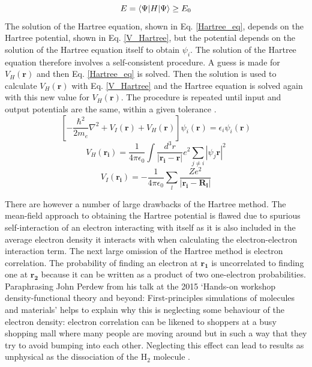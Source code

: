 \documentclass[11pt, twoside]{report}
\begin{document}
\begin{equation}\label{var_princip}
E = \braket{\Psi | H | \Psi } \geq E_0
\end{equation}
The solution of the Hartree equation, shown in Eq. \ref{Hartree_eq}, depends on the Hartree potential, shown in Eq. \ref{V_Hartree}, but the potential depends on the solution of the Hartree equation itself to obtain $\psi_i$. The solution of the Hartree equation therefore involves a self-consistent procedure. A guess is made for $V_H(\mathbf{r})$ and then Eq. \ref{Hartree_eq} is solved. Then the solution is used to calculate $V_H(\mathbf{r})$ with Eq. \ref{V_Hartree} and the Hartree equation is solved again with this new value for $V_H(\mathbf{r})$. The procedure is repeated until input and output potentials are the same, within a given tolerance \cite{Prasad_ch2}.
\begin{equation}\label{Hartree_eq}
\left[ -\frac{\hbar^2}{2m_e}\nabla^2 + V_I(\mathbf{r}) + V_H(\mathbf{r}) \right] \psi_i(\mathbf{r}) = \epsilon_i \psi_i(\mathbf{r})
\end{equation}
\begin{equation}\label{V_Hartree}
V_H(\mathbf{r_i}) = \frac{1}{4 \pi \epsilon_0} \int \frac{d^3r}{|\mathbf{r_i} - \mathbf{r}|}e^2 \sum_{j \neq i} |\psi_j\mathbf{r}|^2
\end{equation}
\begin{equation}\label{V_I}
V_I(\mathbf{r_i}) = -\frac{1}{4 \pi \epsilon_0} \sum_l \frac{Ze^2}{|\mathbf{r_i} - \mathbf{R_l}|}
\end{equation}

There are however a number of large drawbacks of the Hartree method. The mean-field approach to obtaining the Hartree potential is flawed due to spurious self-interaction of an electron interacting with itself as it is also included in the average electron density it interacts with when calculating the electron-electron interaction term.
The next large omission of the Hartree method is electron correlation. The probability of finding an electron at $\mathbf{r_1}$ is uncorrelated to finding one at $\mathbf{r_2}$ because it can be written as a product of two one-electron probabilities. Paraphrasing John Perdew from his talk at the 2015 `Hands-on workshop density-functional theory and beyond: First-principles simulations of molecules and materials' helps to explain why this is neglecting some behaviour of the electron density: electron correlation can be likened to shoppers at a busy shopping mall where many people are moving around but in such a way that they try to avoid bumping into each other. Neglecting this effect can lead to results as unphysical as the dissociation of the H$_2$ molecule \cite{Prasad_ch2}.
\end{document}
